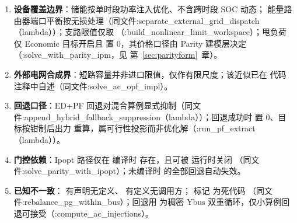 \begin{enumerate}
  \item \textbf{设备覆盖边界}：储能按单时段功率注入优化、不含跨时段 SOC 动态；
        能量路由器端口平衡按无损处理（同文件:separate\_external\_grid\_dispatch（lambda））；支路限值仅取
        （:build\_nonlinear\_limit\_workspace）；甩负荷仅 Economic 目标开启且 
        置 0，其价格口径由 Parity 建模层决定（:solve\_with\_parity\_ipm，见
        第~\ref{sec:parityform}~章）。
  \item \textbf{外部电网合成界}：短路容量并非进口限值，仅作有限尺度；该近似已在
        代码注释中自述（同文件:solve\_ac\_opf\_impl）。
  \item \textbf{回退口径}：ED+PF 回退对混合算例显式抑制（同文件:append\_hybrid\_fallback\_suppression（lambda））；回退成功时  置 0、目标按钳制后出力
        重算，属可行性投影而非优化解（:run\_pf\_extract（lambda））。
  \item \textbf{门控依赖}：Ipopt 路径仅在  编译时
        存在，且可被  运行时关闭
        （同文件:solve\_parity\_with\_ipopt）；未编译时  的全部回退自动失效。
  \item \textbf{已知不一致}： 有声明无定义、
         有定义无调用方；
         标记  为死代码
        （同文件:rebalance\_pg\_within\_bus）；回退用  为稠密 Ybus
        双重循环，仅小算例回退可接受（:compute\_ac\_injections）。
\end{enumerate}
